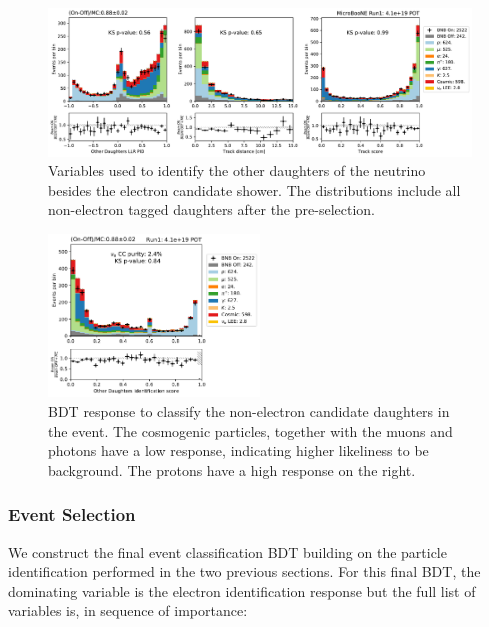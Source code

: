 \begin{figure}
    \centering
    \includegraphics[width=\textwidth]{NueCCsel/Images/run1/pre_daughter_1.pdf}
    \caption{Variables used to identify the other daughters of the neutrino besides the electron candidate shower. The distributions include all non-electron tagged daughters after the pre-selection.}
    \label{fig:pre_daughter_1}
\end{figure}


\begin{figure}[H]
    \centering
    \includegraphics[width=0.5\textwidth]{NueCCsel/Images/run1/pre_daughter_score.pdf}
    \caption{BDT response to classify the non-electron candidate daughters in the event. The cosmogenic particles, together with the muons and photons have a low response, indicating higher likeliness to be background. The protons have a high response on the right.}
    \label{fig:pre_daughter_score}
\end{figure}

\subsubsection{Event Selection}
We construct the final event classification BDT building on the particle identification performed in the two previous sections. For this final BDT, the dominating variable is the electron identification response but the full list of variables is, in sequence of importance:

